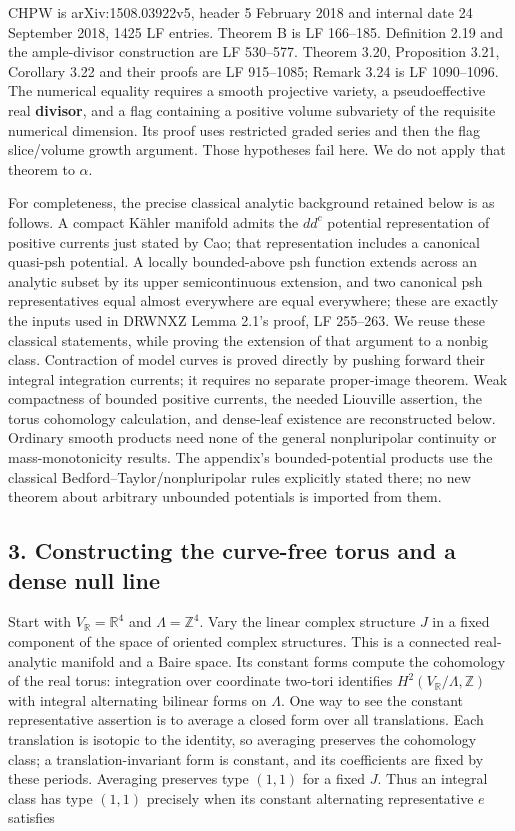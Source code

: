 \documentclass[11pt]{article}
\begin{document}
CHPW is arXiv:1508.03922v5, header 5 February 2018 and internal date 24 September 2018, 1425 LF entries. Theorem B is LF 166–185. Definition 2.19 and the ample-\allowbreak{}divisor construction are LF 530–577. Theorem 3.20, Proposition 3.21, Corollary 3.22 and their proofs are LF 915–1085; Remark 3.24 is LF 1090–1096. The numerical equality requires a smooth projective variety, a pseudoeffective real \textbf{divisor}, and a flag containing a positive volume subvariety of the requisite numerical dimension. Its proof uses restricted graded series and then the flag slice/\allowbreak{}volume growth argument. Those hypotheses fail here. We do not apply that theorem to $\alpha$.

For completeness, the precise classical analytic background retained below is as follows. A compact Kähler manifold admits the $dd^c$ potential representation of positive currents just stated by Cao; that representation includes a canonical quasi-\allowbreak{}psh potential. A locally bounded-\allowbreak{}above psh function extends across an analytic subset by its upper semicontinuous extension, and two canonical psh representatives equal almost everywhere are equal everywhere; these are exactly the inputs used in DRWNXZ Lemma 2.1's proof, LF 255–263. We reuse these classical statements, while proving the extension of that argument to a nonbig class. Contraction of model curves is proved directly by pushing forward their integral integration currents; it requires no separate proper-\allowbreak{}image theorem. Weak compactness of bounded positive currents, the needed Liouville assertion, the torus cohomology calculation, and dense-\allowbreak{}leaf existence are reconstructed below. Ordinary smooth products need none of the general nonpluripolar continuity or mass-\allowbreak{}monotonicity results. The appendix's bounded-\allowbreak{}potential products use the classical Bedford–Taylor/\allowbreak{}nonpluripolar rules explicitly stated there; no new theorem about arbitrary unbounded potentials is imported from them.

\subsection{3. Constructing the curve-\allowbreak{}free torus and a dense null line}

Start with $V_{\mathbb R}=\mathbb R^4$ and $\Lambda=\mathbb Z^4$. Vary the linear complex structure $J$ in a fixed component of the space of oriented complex structures. This is a connected real-\allowbreak{}analytic manifold and a Baire space. Its constant forms compute the cohomology of the real torus: integration over coordinate two-\allowbreak{}tori identifies $H^2(V_{\mathbb R}/\Lambda,\mathbb Z)$ with integral alternating bilinear forms on $\Lambda$. One way to see the constant representative assertion is to average a closed form over all translations. Each translation is isotopic to the identity, so averaging preserves the cohomology class; a translation-\allowbreak{}invariant form is constant, and its coefficients are fixed by these periods. Averaging preserves type $(1,1)$ for a fixed $J$. Thus an integral class has type $(1,1)$ precisely when its constant alternating representative $e$ satisfies
\end{document}
